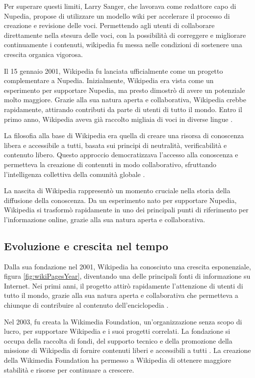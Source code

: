 \documentclass[12pt,a4paper]{report}
\begin{document}
Per superare questi limiti, Larry Sanger, che lavorava come redattore capo di Nupedia, propose di utilizzare un modello wiki per accelerare il processo di creazione e revisione delle voci. Permettendo agli utenti di collaborare direttamente nella stesura delle voci, con la possibilità di correggere e migliorare continuamente i contenuti, wikipedia fu messa nelle condizioni di sostenere una crescita organica vigorosa\cite{reagle2010good}.

Il 15 gennaio 2001, Wikipedia fu lanciata ufficialmente come un progetto complementare a Nupedia. Inizialmente, Wikipedia era vista come un esperimento per supportare Nupedia, ma presto dimostrò di avere un potenziale molto maggiore. Grazie alla sua natura aperta e collaborativa, Wikipedia crebbe rapidamente, attirando contributi da parte di utenti di tutto il mondo. Entro il primo anno, Wikipedia aveva già raccolto migliaia di voci in diverse lingue \cite{jemielniak2014wikipedia}.

La filosofia alla base di Wikipedia era quella di creare una risorsa di conoscenza libera e accessibile a tutti, basata sui principi di neutralità, verificabilità e contenuto libero. Questo approccio democratizzava l'accesso alla conoscenza e permetteva la creazione di contenuti in modo collaborativo, sfruttando l'intelligenza collettiva della comunità globale \cite{denning2005wikipedia}.

La nascita di Wikipedia rappresentò un momento cruciale nella storia della diffusione della conoscenza. Da un esperimento nato per supportare Nupedia, Wikipedia si trasformò rapidamente in uno dei principali punti di riferimento per l'informazione online, grazie alla sua natura aperta e collaborativa.

\subsection{Evoluzione e crescita nel tempo}

Dalla sua fondazione nel 2001, Wikipedia ha conosciuto una crescita esponenziale, figura \cref{fig:wikiPagesYear}, diventando una delle principali fonti di informazione su Internet. Nei primi anni, il progetto attirò rapidamente l'attenzione di utenti di tutto il mondo, grazie alla sua natura aperta e collaborativa che permetteva a chiunque di contribuire al contenuto dell'enciclopedia \cite{lih2009wikipedia}.

Nel 2003, fu creata la Wikimedia Foundation, un'organizzazione senza scopo di lucro, per supportare Wikipedia e i suoi progetti correlati. La fondazione si occupa della raccolta di fondi, del supporto tecnico e della promozione della missione di Wikipedia di fornire contenuti liberi e accessibili a tutti \cite{reagle2010good}. La creazione della Wikimedia Foundation ha permesso a Wikipedia di ottenere maggiore stabilità e risorse per continuare a crescere.
\end{document}
